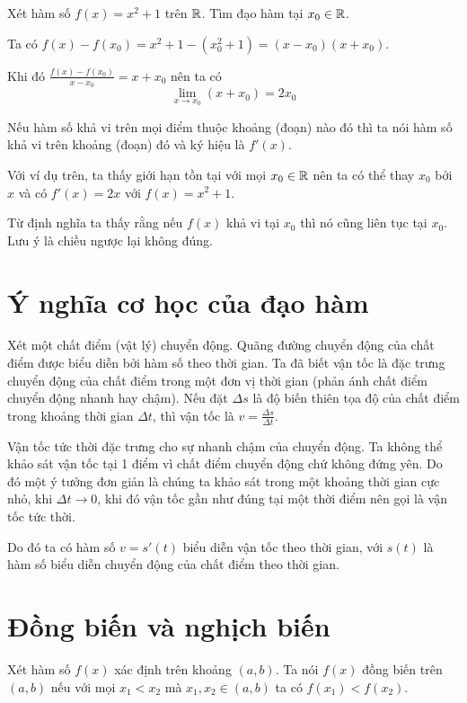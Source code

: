\begin{example}
    Xét hàm số $f(x) = x^2 + 1$ trên $\mathbb{R}$. Tìm đạo hàm tại $x_0 \in \mathbb{R}$.

    Ta có $f(x)-f(x_0) = x^2 + 1 - (x_0^2 + 1) = (x - x_0) (x + x_0)$.

    Khi đó $\frac{f(x)-f(x_0)}{x-x_0} = x + x_0$ nên ta có
    \[ \lim_{x \to x_0} (x + x_0) = 2 x_0 \]
\end{example}

Nếu hàm số khả vi trên mọi điểm thuộc khoảng (đoạn) nào đó thì
ta nói hàm số khả vi trên khoảng (đoạn) đó và ký hiệu là $f'(x)$.

Với ví dụ trên, ta thấy giới hạn tồn tại với mọi $x_0 \in \mathbb{R}$ nên ta có thể
thay $x_0$ bởi $x$ và có $f'(x) = 2x$ với $f(x) = x^2 + 1$.

\begin{remark}
    Từ định nghĩa ta thấy rằng nếu $f(x)$ khả vi tại $x_0$ thì nó cũng liên tục tại $x_0$.
    Lưu ý là chiều ngược lại không đúng.
\end{remark}

\section{Ý nghĩa cơ học của đạo hàm}

Xét một chất điểm (vật lý) chuyển động. Quãng đường chuyển động của chất điểm được 
biểu diễn bởi hàm số theo thời gian. Ta đã biết vận tốc là đặc trưng chuyển động của 
chất điểm trong một đơn vị thời gian (phản ánh chất điểm chuyển động nhanh hay chậm).
Nếu đặt $\Delta s$ là độ biến thiên tọa độ của chất điểm trong khoảng thời gian $\Delta t$,
thì vận tốc là $v = \frac{\Delta s}{\Delta t}$.

Vận tốc tức thời đặc trưng cho sự nhanh chậm của chuyển động.
Ta không thể khảo sát vận tốc tại 1 điểm vì chất điểm chuyển động
chứ không đứng yên. Do đó một ý tưởng đơn giản là chúng ta khảo sát
trong một khoảng thời gian cực nhỏ, khi $\Delta t \to 0$, khi đó
vận tốc gần như đúng tại một thời điểm nên gọi là vận tốc tức thời.

Do đó ta có hàm số $v = s'(t)$ biểu diễn vận tốc theo thời gian, 
với $s(t)$ là hàm số biểu diễn chuyển động của chất điểm theo thời gian.

\section{Đồng biến và nghịch biến}

\begin{definition}
    Xét hàm số $f(x)$ xác định trên khoảng $(a, b)$. Ta nói $f(x)$ đồng biến trên $(a, b)$ 
    nếu với mọi $x_1 < x_2$ mà $x_1, x_2 \in (a, b)$ ta có $f(x_1) < f(x_2)$.
\end{definition}

